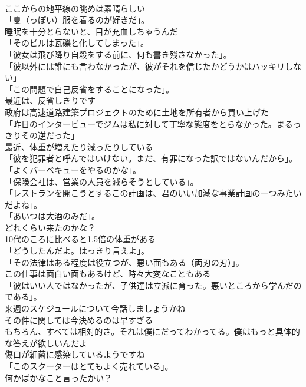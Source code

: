 \documentclass[8pt]{extreport}
\begin{document}
\begin{CJK}{UTF8}{min}
\\	ここからの地平線の眺めは素晴らしい	
\\	「夏（っぽい）服を着るのが好きだ」。	
\\	睡眠を十分とらないと、目が充血しちゃうんだ	
\\	「そのビルは瓦礫と化してしまった」。	
\\	「彼女は飛び降り自殺をする前に、何も書き残さなかった」。	
\\	「彼以外には誰にも言わなかったが、彼がそれを信じたかどうかはハッキリしない」	
\\	「この問題で自己反省をすることになった」。	
\\	最近は、反省しきりです	
\\	政府は高速道路建築プロジェクトのために土地を所有者から買い上げた	
\\	「昨日のインタービューでジムは私に対して丁寧な態度をとらなかった。まるっきりその逆だった」	
\\	最近、体重が増えたり減ったりしている	
\\	「彼を犯罪者と呼んではいけない。まだ、有罪になった訳ではないんだから」。	
\\	「よくバーベキューをやるのかな」。	
\\	「保険会社は、営業の人員を減らそうとしている」。	
\\	「レストランを開こうとするこの計画は、君のいい加減な事業計画の一つみたいだよね」。	
\\	「あいつは大酒のみだ」。	
\\	どれくらい来たのかな？	
\\	10代のころに比べると1.5倍の体重がある	
\\	「どうしたんだよ。はっきり言えよ」。	
\\	「その法律はある程度は役立つが、悪い面もある（両刃の刃）」。	
\\	この仕事は面白い面もあるけど、時々大変なこともある	
\\	「彼はいい人ではなかったが、子供達は立派に育った。悪いところから学んだのである」。	
\\	来週のスケジュールについて今話しましょうかね	
\\	その件に関しては今決めるのは早すぎる	
\\	もちろん、すべては相対的さ。それは僕にだってわかってる。僕はもっと具体的な答えが欲しいんだよ	
\\	傷口が細菌に感染しているようですね	
\\	「このスクーターはとてもよく売れている」。	
\\	何かばかなこと言ったかい？	

\end{CJK}
\end{document}
